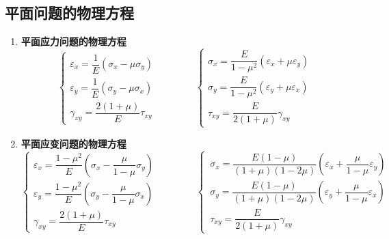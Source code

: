 \documentclass[10pt,a4]{article}
\numberwithin{equation}{section}
\begin{document}
	\subsection{平面问题的物理方程}
	\begin{enumerate}
		\item \textbf{平面应力问题的物理方程}
		\begin{equation}
			\begin{cases}
				\varepsilon_x = \dfrac{1}{E}(\sigma_x - \mu \sigma_y) \\[0.7em]
				\varepsilon_y = \dfrac{1}{E}(\sigma_y - \mu \sigma_x)\\[0.7em]
				\gamma_{xy} = \dfrac{2(1+\mu)}{E}\tau_{xy}
			\end{cases}
			\qquad \qquad
			\begin{cases}
				\sigma_x = \dfrac{E}{1 - \mu^2}(\varepsilon_x + \mu \varepsilon_y)\\[0.7em]
				\sigma_{y} = \dfrac{E}{1 - \mu^2}(\varepsilon_y + \mu \varepsilon_x)\\[0.7em]
				\tau_{xy} = \dfrac{E}{2(1+\mu)}\gamma_{xy}
			\end{cases}
			\label{平面应力物理方程}
		\end{equation}
		
		\item \textbf{平面应变问题的物理方程}
		\begin{equation}
			\begin{cases}
				\varepsilon_x = \dfrac{1 -\mu^2}{E}(\sigma_x - \dfrac{\mu}{1 - \mu} \sigma_y) \\[0.7em]
				\varepsilon_y = \dfrac{1 - \mu^2}{E}(\sigma_y - \dfrac{\mu}{1-\mu} \sigma_x)\\[0.7em]
				\gamma_{xy} = \dfrac{2(1+\mu)}{E}\tau_{xy}
			\end{cases}
			\qquad \qquad
			\begin{cases}
				\, \sigma_x = \dfrac{E(1 - \mu)}{(1 + \mu)(1 -2\mu)}
				\left( \varepsilon_x + \dfrac{\mu}{1 - \mu} \varepsilon_y \right)
				\\[0.7em]
				\, \sigma_{y} = \dfrac{E(1 - \mu)}{(1 + \mu)(1 -2\mu)}
				\left(\varepsilon_y + \dfrac{\mu}{1 - \mu} \varepsilon_x \right)
				\\[0.7em]
				\, \tau_{xy} = \dfrac{E}{2(1+\mu)}\gamma_{xy}
			\end{cases}
		\end{equation}
	\end{enumerate}
	
\end{document}
